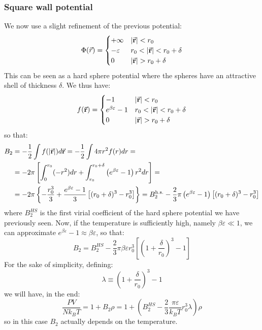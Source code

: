 \documentclass[../../Main/Main.tex]{subfiles}
\begin{document}
\subsubsection{Square wall potential}
We now use a slight refinement of the previous potential:
\begin{equation}
   \Phi ({\vec {r}})={\begin{cases}+\infty &|{\va {r}}|<r_{0}\\-\varepsilon &r_{0}<|{\va {r}}|<r_{0}+\delta \\0&|{\va {r}}|>r_{0}+\delta \end{cases}}
\end{equation}
This can be seen as a hard sphere potential where the spheres have an attractive shell of thickness \( \delta  \). We thus have:
\begin{equation}
f({\va {r}})={\begin{cases}-1&|{\va {r}}|<r_{0}\\e^{\beta \varepsilon }-1&r_{0}<|{\va {r}}|<r_{0}+\delta \\0&|{\va {r}}|>r_{0}+\delta \end{cases}}
\end{equation}
so that:
\begin{equation*}
\begin{split}
  B_{2} & =-{\frac {1}{2}}\int f(|{\va {r}}|)d{\va {r}}=-{\frac {1}{2}}\int 4\pi r^{2}f(r)dr=\\
  &=-2\pi \left[\int _{0}^{r_{0}}(-r^{2})dr+\int _{r_{0}}^{r_{0}+\delta }\left(e^{\beta \varepsilon }-1\right)r^{2}dr\right]=\\
  &=-2\pi \left\lbrace -{\frac {r_{0}^{3}}{3}}+{\frac {e^{\beta \varepsilon }-1}{3}}\left[(r_{0}+\delta )^{3}-r_{0}^{3}\right]\right\rbrace =B_{2}^{\text{h.s.}}-{\frac {2}{3}}\pi \left(e^{\beta \varepsilon }-1\right)\left[(r_{0}+\delta )^{3}-r_{0}^{3}\right]
\end{split}
\end{equation*}
where  \( B_2^{HS} \) is the first virial coefficient of the hard sphere potential we have previously seen. Now, if the temperature is sufficiently high, namely \(  \beta \varepsilon \ll 1\), we can approximate \( e^{\beta \varepsilon }-1\approx \beta \varepsilon \), so that:
\begin{equation}
  B_{2}=B_2^{HS} -{\frac {2}{3}}\pi \beta \varepsilon r_{0}^{3}\left[\left(1+{\frac {\delta }{r_{0}}}\right)^{3}-1\right]
\end{equation}
For the sake of simplicity, defining:
\begin{equation*}
  \lambda \equiv \left(1+{\frac {\delta }{r_{0}}}\right)^{3}-1
\end{equation*}
we will have, in the end:
\begin{equation}
  { \frac {PV}{Nk_{B}T}}=1+B_{2}\rho =1+\left(B_2^{HS} -{\frac {2}{3}}{\frac {\pi \varepsilon }{k_{B}T}}r_{0}^{3}\lambda \right)\rho
\end{equation}
so in this case  \( B_2 \) actually depends on the temperature.
\end{document}
